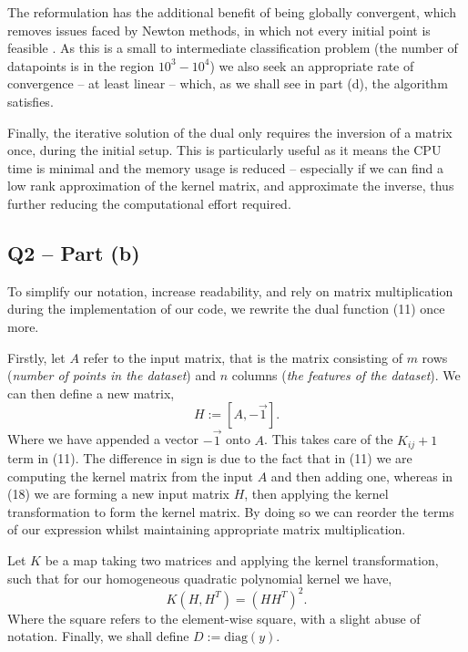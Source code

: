 \documentclass{article}
\begin{document}
The reformulation has the additional benefit of being globally convergent, which removes issues faced by Newton methods, in which not every initial point is feasible \cite{boyd2004convex}.
As this is a small to intermediate classification problem (the number of datapoints is in the region $10^{3} - 10^{4}$) we also seek an appropriate rate of convergence – at least linear – which, as we shall see in part (d), the algorithm satisfies. \par

Finally, the iterative solution of the dual only requires the inversion of a matrix once, during the initial setup. This is particularly useful as it means the CPU time is minimal and the memory usage is reduced – especially if we can find a low rank approximation of the kernel matrix, and approximate the inverse, thus further reducing the computational effort required. 

\subsection*{\textbf{Q2 – Part (b)}}
To simplify our notation, increase readability, and rely on matrix multiplication during the implementation of our code, we rewrite the dual function (11) once more. \par

Firstly, let $A$ refer to the input matrix, that is the matrix consisting of $m$ rows (\textit{number of points in the dataset}) and $n$ columns (\textit{the features of the dataset}).
We can then define a new matrix,
\begin{equation}
    H := [A, -\Vec{1}].
\end{equation}
Where we have appended a vector $-\Vec{1}$ onto $A$. This takes care of the $K_{ij} + 1$ term in (11). The difference in sign is due to the fact that in (11) we are computing the kernel matrix from the input $A$ and then adding one, whereas in (18) we are forming a new input matrix $H$, then applying the kernel transformation to form the kernel matrix. By doing so we can reorder the terms of our expression whilst maintaining appropriate matrix multiplication. \par
Let $K$ be a map taking two matrices and applying the kernel transformation, such that for our homogeneous quadratic polynomial kernel we have, 
\begin{equation}
    K(H,H^{T}) = (H H^{T})^2.
\end{equation} 
Where the square refers to the element-wise square, with a slight abuse of notation. Finally, we shall define $D := \text{diag}(y)$.
\end{document}
